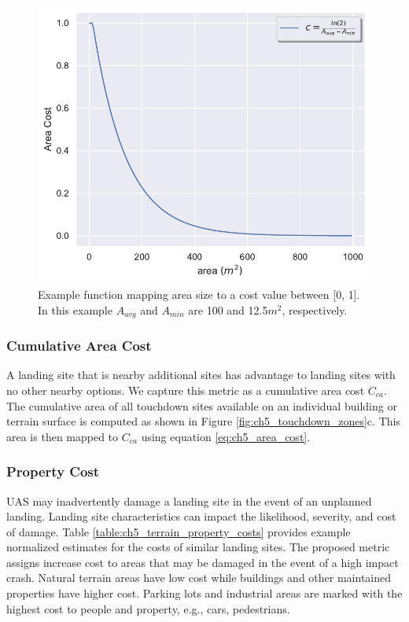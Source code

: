 \begin{figure}[ht]
    \centering
    \includegraphics[clip, trim=0.2cm 0cm 0cm 0cm, width=0.5\linewidth]{chapter_5_mapping/imgs/area_cost.pdf}
    \caption[Mapping area size to risk]{Example function mapping area size to a cost value between [0, 1]. In this example $A_{avg}$ and $A_{min}$ are 100 and 12.5$m^2$, respectively. }
    \label{fig:ch5_ny_area_cost}
\end{figure}


\subsubsection{Cumulative Area Cost}
A landing site that is nearby additional sites has advantage to landing sites with no other nearby options. 
We capture this metric as a cumulative area cost $C_{ca}$.  The cumulative area of all touchdown sites available on an individual building or terrain surface is computed as shown in Figure \ref{fig:ch5_touchdown_zones}c.  This area is then mapped to $C_{ca}$ using equation \ref{eq:ch5_area_cost}.

\subsubsection{Property Cost}\label{sec:ch5_property_cost}
\ac{UAS} may inadvertently damage a landing site in the event of an unplanned landing. Landing site characteristics can impact the likelihood, severity, and cost of damage. Table \ref{table:ch5_terrain_property_costs} provides example normalized estimates for the costs of similar landing sites. The proposed metric assigns increase cost to areas that may be damaged in the event of a high impact crash. Natural terrain areas have low cost while buildings and other maintained properties have higher cost. Parking lots and industrial areas are marked with the highest cost to people and property, e.g., cars, pedestrians. %

